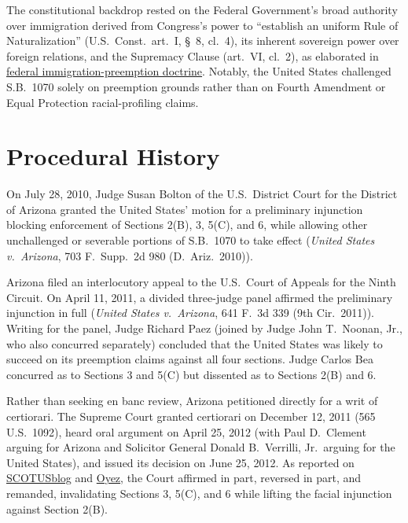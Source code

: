 \documentclass[12pt]{article}
\begin{document}
The constitutional backdrop rested on the Federal Government's broad authority over immigration derived from Congress's power to ``establish an uniform Rule of Naturalization'' (U.S.\ Const.\ art.\ I, \S~8, cl.\ 4), its inherent sovereign power over foreign relations, and the Supremacy Clause (art.\ VI, cl.\ 2), as elaborated in \href{https://www.law.cornell.edu/constitution-conan/article-1/section-8/clause-1/immigration-related-state-laws}{federal immigration-preemption doctrine}. Notably, the United States challenged S.B.\ 1070 solely on preemption grounds rather than on Fourth Amendment or Equal Protection racial-profiling claims.

\section{Procedural History}

On July 28, 2010, Judge Susan Bolton of the U.S.\ District Court for the District of Arizona granted the United States' motion for a preliminary injunction blocking enforcement of Sections 2(B), 3, 5(C), and 6, while allowing other unchallenged or severable portions of S.B.\ 1070 to take effect (\textit{United States v.\ Arizona}, 703 F.\ Supp.\ 2d 980 (D.\ Ariz.\ 2010)).

Arizona filed an interlocutory appeal to the U.S.\ Court of Appeals for the Ninth Circuit. On April 11, 2011, a divided three-judge panel affirmed the preliminary injunction in full (\textit{United States v.\ Arizona}, 641 F.\ 3d 339 (9th Cir.\ 2011)). Writing for the panel, Judge Richard Paez (joined by Judge John T.\ Noonan, Jr., who also concurred separately) concluded that the United States was likely to succeed on its preemption claims against all four sections. Judge Carlos Bea concurred as to Sections 3 and 5(C) but dissented as to Sections 2(B) and 6.

Rather than seeking en banc review, Arizona petitioned directly for a writ of certiorari. The Supreme Court granted certiorari on December 12, 2011 (565 U.S.\ 1092), heard oral argument on April 25, 2012 (with Paul D.\ Clement arguing for Arizona and Solicitor General Donald B.\ Verrilli, Jr.\ arguing for the United States), and issued its decision on June 25, 2012. As reported on \href{https://www.scotusblog.com/cases/arizona-v-united-states/}{SCOTUSblog} and \href{https://www.oyez.org/cases/2011/11-182}{Oyez}, the Court affirmed in part, reversed in part, and remanded, invalidating Sections 3, 5(C), and 6 while lifting the facial injunction against Section 2(B).
\end{document}
